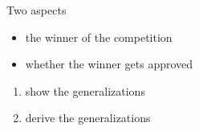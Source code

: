 \documentclass[xcolor=dvipsnames,10pt]{beamer}
\begin{document}
\begin{frame}{Two aspects}

\pause

\begin{itemize}
  \item the winner of the competition  \pause
  \item whether the winner gets approved 
\end{itemize}

\pause
\pause

\vspace{1em}

\begin{enumerate}
  \item show the generalizations\pause
  \item derive the generalizations
\end{enumerate}

\end{frame}
\end{document}

